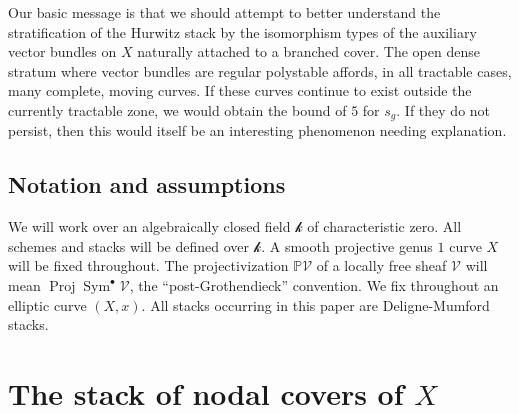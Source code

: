 \documentclass[reqno, 11pt]{amsart}
\renewcommand{\P}{\mathbb{P}}
\renewcommand{\k}{\mathscr{k}}
\DeclareMathOperator{\Sym}{Sym}
\DeclareMathOperator{\Proj}{Proj}
\begin{document}
Our basic message is that we should attempt to better understand the stratification of the Hurwitz stack by the isomorphism types of the auxiliary vector bundles on $X$ naturally attached to a branched cover.  The open dense stratum where vector bundles are regular polystable affords, in all tractable cases, many complete, moving curves. If these curves continue to exist outside the currently tractable zone, we would obtain the bound of $5$ for $s_g$.  If they do not persist,  then this would itself be an interesting phenomenon needing explanation.



\subsection{Notation and assumptions}
We will work over an algebraically closed field $\k$ of characteristic zero. All schemes and stacks will be defined over $\k$.    A smooth projective genus $1$ curve $X$ will be fixed throughout.   The projectivization $\P \mathcal{V}$ of a locally free sheaf $\mathcal{V}$ will mean $\Proj \Sym^{\bullet} \mathcal{V}$, the ``post-Grothendieck'' convention.  We fix throughout an elliptic curve $(X,x)$.  All stacks occurring in this paper are Deligne-Mumford stacks. 

\section{The stack of nodal covers of $X$} 
 
\end{document}

